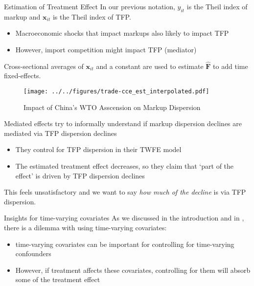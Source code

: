 \documentclass[aspectratio=169,t,11pt,table]{beamer}
\def\*#1{\mathbf{#1}}
\begin{document}
\begin{frame}{Estimation of Treatment Effect}
  In our previous notation, $y_{it}$ is the Theil index of markup and $\*x_{it}$ is the Theil index of TFP. 
  \begin{itemize}
    \item Macroeconomic shocks that impact markups also likely to impact TFP 
    \item However, import competition might impact TFP (mediator)
  \end{itemize} 
  
  \bigskip
  Cross-sectional averages of $\*x_{it}$ and a constant are used to estimate $\hat{\*{F}}$ to add time fixed-effects. 
\end{frame}

\begin{frame}
  \begin{figure}
    \caption{Impact of China's WTO Asscension on Markup Dispersion}
    \texttt{[image: ../../figures/trade-cce\_est\_interpolated.pdf]}
  \end{figure}
\end{frame}

\begin{frame}{Mediated effects}
  \citet{lu2015trade} try to informally understand if markup dispersion declines are mediated via TFP dispersion declines
  \begin{itemize}
    \item They control for TFP dispersion in their TWFE model 
    \item The estimated treatment effect decreases, so they claim that `part of the effect' is driven by TFP dispersion declines
  \end{itemize}

  \bigskip
  This feels unsatisfactory and we want to say \emph{how much of the decline} is via TFP dispersion.
\end{frame}

\begin{frame}{Insights for time-varying covariates}
  As we discussed in the introduction and in \citet{Caetano_Callaway_Payne_Rodrigues_2022}, there is a dilemma with using time-varying covariates:
  \begin{itemize}
    \item time-varying covariates can be important for controlling for time-varying confounders
    
    \item However, if treatment affects these covariates, controlling for them will absorb some of the treatment effect
  \end{itemize}
\end{frame}
\end{document}
